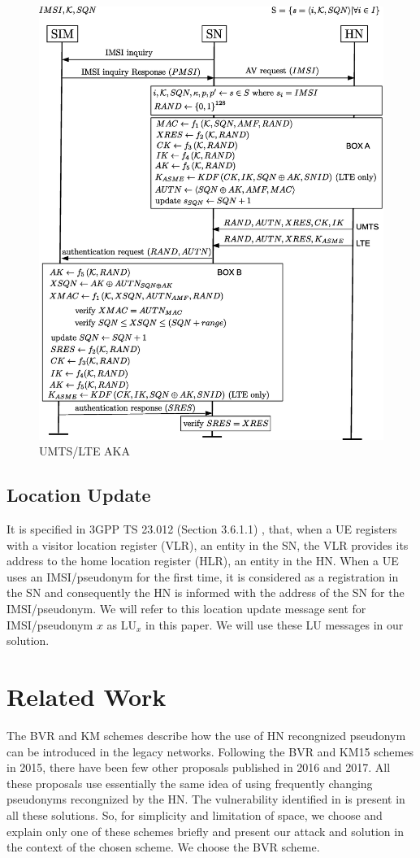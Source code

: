 \documentclass{llncs} %
\begin{document}
\begin{figure}[]
  \centering
    \includegraphics[width=.9\textwidth]{UMTS_LTE_AKA.eps}
  \caption{UMTS/LTE AKA}
  \label{fig:UMTS_LTE_AKA}
\end{figure}

\subsection{Location Update} It is specified in 3GPP TS 23.012 (Section 3.6.1.1) \cite{TS23012}, that, when a UE registers with a visitor location register (VLR), an entity in the SN, the  VLR provides its address to the home location register (HLR), an entity in the HN. When a UE uses an IMSI/pseudonym for the first time, it is considered as a registration in the SN and consequently the HN is informed with the address of the SN for the IMSI/pseudonym. We will refer to this location update message sent for IMSI/pseudonym $x$ as $\text{LU}_{x}$ in this paper. We will use these LU messages in our solution.


\section{Related Work}
The BVR and KM schemes describe how the use of HN recongnized pseudonym can be introduced in the legacy networks. Following the BVR and KM15 schemes in 2015, there have been few other proposals \cite{Ginzboorg_Niemi_2016,Norrman_Naslund_Dubrova_2016,yemen2017} published in 2016 and 2017. All these proposals use essentially the same idea of using frequently changing pseudonyms recongnized by the HN. The vulnerability identified in \cite{wisec17} is present in all these solutions. So, for simplicity and limitation of space, we choose and explain only one of these schemes briefly and present our attack and solution in the context of the chosen scheme. We choose the BVR scheme.
\end{document}
